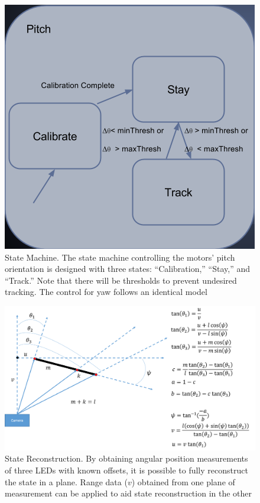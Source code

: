 \documentclass[conference, twocolumn]{IEEEtran}
\begin{document}
\begin{figure}[!t]
\begin{center}
\includegraphics[width=0.7\linewidth]{../images/pitch_state2}
\end{center}

\caption{State Machine. The state machine controlling the motors' pitch orientation is designed with three states: ``Calibration,'' ``Stay,'' and ``Track.'' Note that there will be thresholds to prevent undesired tracking. The control for yaw follows an identical model}
\label{fig:pitch_state}
\end{figure}

\begin{figure}[!t]
\begin{center}
\includegraphics[width=\linewidth]{../images/geometry_and_equations3}
\end{center}

\caption{State Reconstruction. By obtaining angular position measurements of three LEDs with known offsets, it is possible to fully reconstruct the state in a plane. Range data ($v$) obtained from one plane of measurement can be applied to aid state reconstruction in the other}
\label{fig:geometry}
\end{figure}
\end{document}
